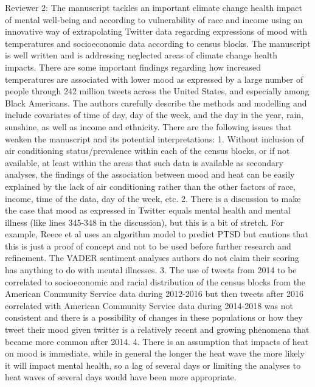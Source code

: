 Reviewer 2: The manuscript tackles an important climate change health impact of mental well-being and according to vulnerability of race and income using an innovative way of extrapolating Twitter data regarding expressions of mood with temperatures and socioeconomic data according to census blocks.
The manuscript is well written and is addressing neglected areas of climate change health impacts. There are some important findings regarding how increased temperatures are associated with lower mood as expressed by a large number of people through 242 million tweets across the United States, and especially among Black Americans. The authors carefully describe the methods and modelling and include covariates of time of day, day of the week, and the day in the year, rain, sunshine, as well as income and ethnicity.
There are the following issues that weaken the manuscript and its potential interpretations:
1. Without inclusion of air conditioning status/prevalence within each of the census blocks, or if not available, at least within the areas that such data is available as secondary analyses, the findings of the association between mood and heat can be easily explained by the lack of air conditioning rather than the other factors of race, income, time of the data, day of the week, etc.
2. There is a discussion to make the case that mood as expressed in Twitter equals mental health and mental illness (like lines 345-348 in the discussion), but this is a bit of stretch. For example, Reece et al uses an algorithm model to predict PTSD but cautions that this is just a proof of concept and not to be used before further research and refinement. The VADER sentiment analyses authors do not claim their scoring has anything to do with mental illnesses.
3. The use of tweets from 2014 to be correlated to socioeconomic and racial distribution of the census blocks from the American Community Service data during 2012-2016 but then tweets after 2016 correlated with American Community Service data during 2014-2018 was not consistent and there is a possibility of changes in these populations or how they tweet their mood given twitter is a relatively recent and growing phenomena that became more common after 2014.
4. There is an assumption that impacts of heat on mood is immediate, while in general the longer the heat wave the more likely it will impact mental health, so a lag of several days or limiting the analyses to heat waves of several days would have been more appropriate.
